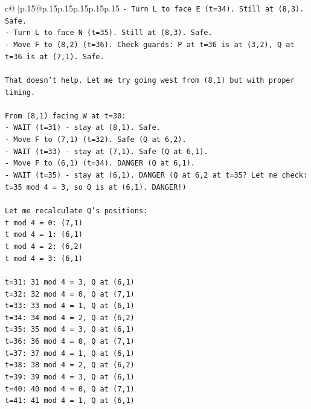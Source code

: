 \documentclass{article}
\begin{document}
{\begin{supertabular}{c@{$\;$}|p{.15\linewidth}@{}p{.15\linewidth}p{.15\linewidth}p{.15\linewidth}p{.15\linewidth}p{.15\linewidth}}
{{{\texttt{{-} Turn L to face E (t=34). Still at (8,3). Safe.} \\
\texttt{{-} Turn L to face N (t=35). Still at (8,3). Safe.} \\
\texttt{{-} Move F to (8,2) (t=36). Check guards: P at t=36 is at (3,2), Q at t=36 is at (7,1). Safe.} \\
\\ 
\texttt{That doesn't help. Let me try going west from (8,1) but with proper timing.} \\
\\ 
\texttt{From (8,1) facing W at t=30:} \\
\texttt{{-} WAIT (t=31) {-} stay at (8,1). Safe.} \\
\texttt{{-} Move F to (7,1) (t=32). Safe (Q at 6,2).} \\
\texttt{{-} WAIT (t=33) {-} stay at (7,1). Safe (Q at 6,1).} \\
\texttt{{-} Move F to (6,1) (t=34). DANGER (Q at 6,1).} \\
\texttt{{-} WAIT (t=35) {-} stay at (6,1). DANGER (Q at 6,2 at t=35? Let me check: t=35 mod 4 = 3, so Q is at (6,1). DANGER!)} \\
\\ 
\texttt{Let me recalculate Q's positions:} \\
\texttt{t mod 4 = 0: (7,1)} \\
\texttt{t mod 4 = 1: (6,1)} \\
\texttt{t mod 4 = 2: (6,2)} \\
\texttt{t mod 4 = 3: (6,1)} \\
\\ 
\texttt{t=31: 31 mod 4 = 3, Q at (6,1)} \\
\texttt{t=32: 32 mod 4 = 0, Q at (7,1)} \\
\texttt{t=33: 33 mod 4 = 1, Q at (6,1)} \\
\texttt{t=34: 34 mod 4 = 2, Q at (6,2)} \\
\texttt{t=35: 35 mod 4 = 3, Q at (6,1)} \\
\texttt{t=36: 36 mod 4 = 0, Q at (7,1)} \\
\texttt{t=37: 37 mod 4 = 1, Q at (6,1)} \\
\texttt{t=38: 38 mod 4 = 2, Q at (6,2)} \\
\texttt{t=39: 39 mod 4 = 3, Q at (6,1)} \\
\texttt{t=40: 40 mod 4 = 0, Q at (7,1)} \\
\texttt{t=41: 41 mod 4 = 1, Q at (6,1)} \\
\\ 
}}}
\end{supertabular}}
\end{document}
